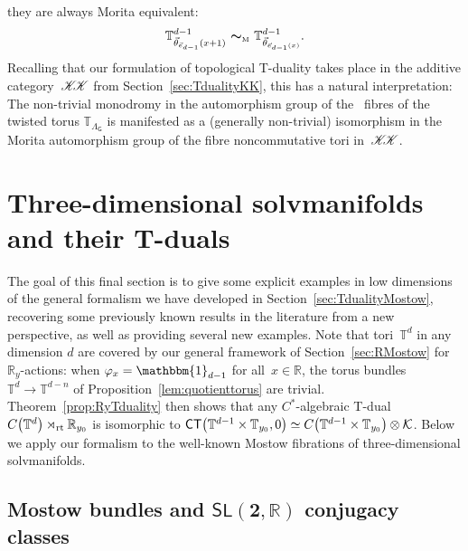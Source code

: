 \documentclass[pdftex]{sigma}
\numberwithin{equation}{section}
\newcommand{\C}{\complex}
\newcommand{\mbf}[1]{{\boldsymbol {#1} }}
\def\T{{\sf T}}
\def\C{{\sf C}}
\newcommand{\unit}{\mathbbm{1}} 			%
\newcommand{\CCK}{\mathscr{K}}
\newcommand{\CK}{\mathcal{K}}
\newcommand{\sfG}{\mathsf{G}}
\newcommand{\sfSL}{\mathsf{SL}}
\newcommand{\rt}{{\rm rt}}
\newcommand{\R}{\real}
\newcommand{\complex}{{\mathbb C}} %
\newcommand{\real}{{\mathbb R}} %
\newcommand{\torus}{{\mathbb T}} %
\begin{document}
\begin{Remark}
they are always Morita
equivalent:
\[
\torus^{d-1}_{\vec\theta_{\vec e_{d-1}}(x+1)} \ \mbf\sim_{\text{\tiny
 M}} \ \torus^{d-1}_{\vec\theta_{\vec e_{d-1}(x)}} .
\]
Recalling that our formulation of topological T-duality takes place in the additive category~${\CCK\hspace{-1mm}\CCK}$ from
Section~\ref{sec:TdualityKK}, this has a natural interpretation: The
non-trivial monodromy in the automorphism group of the~\smash{$\torus^{d-1}$} fibres of the
twisted torus $\torus_{\Lambda_\sfG}$ is
manifested as a (generally non-trivial) isomorphism in the Morita automorphism
group of the fibre noncommutative tori in~${\CCK\hspace{-1mm}\CCK}$.
\end{Remark}

\section{Three-dimensional solvmanifolds and their T-duals}\label{sec:3dexamples}

The goal of this final section is to give some explicit examples in
low dimensions of the general formalism we have developed in
Section~\ref{sec:TdualityMostow}, recovering some previously known
results in the literature from a new perspective, as well as providing several new examples.
Note that tori~$\torus^d$ in any
dimension $d$ are covered by our general framework of
Section~\ref{sec:RMostow} for~$\R_y$-actions: when
\mbox{$\varphi_x=\unit_{d-1}$} for all~$x\in\R$, the torus bundles
$\torus^d\to\torus^{d-n}$ of Proposition~\ref{lem:quotienttorus} are
\mbox{trivial}. Theorem~\ref{prop:RyTduality} then shows that any
$C^*$-algebraic T-dual $C\big(\torus^d\big)\rtimes_\rt\R_{y_0}$ is isomorphic
to $\C\T\big(\torus^{d-1}\times\torus_{y_0},0\big)\simeq
C\big(\torus^{d-1}\times\torus_{y_0}\big)\otimes\CK$. Below we
apply our formalism to the well-known Mostow fibrations of
three-dimensional solvmanifolds.

\subsection[Mostow bundles and $\sfSL(2,\R)$ conjugacy classes]{Mostow bundles and $\boldsymbol{\sfSL(2,\R)}$ conjugacy classes}
\end{document}

